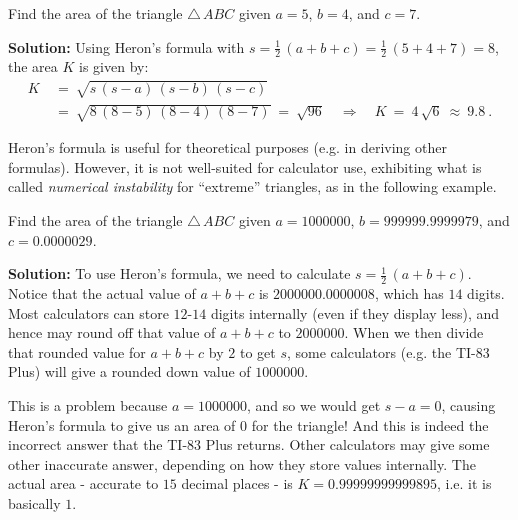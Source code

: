 \begin{exmp}\label{exmp:heron}
\noindent Find the area of the triangle $\triangle\,ABC$ given $a=5$, $b=4$, and $c = 7$.\vspace{1mm}
 \par\noindent\textbf{Solution:} Using Heron's formula with $s = \frac{1}{2}\,(a+b+c) =
 \frac{1}{2}\,(5+4+7) = 8$, the area $K$ is given by:
 \begin{align*}
  K ~&=~ \sqrt{s\,(s-a)\,(s-b)\,(s-c)}\\
   &=~ \sqrt{8\,(8-5)\,(8-4)\,(8-7)} ~=~ \sqrt{96} \quad\Rightarrow\quad \boxed{K ~=~ 4\,\sqrt{6}
   ~\approx~ 9.8} ~.
 \end{align*}
\end{exmp}\vspace{-3mm}
\divider
\vspace{1mm}

Heron's formula is useful for theoretical purposes (e.g. in deriving other formulas).
However, it is not well-suited for calculator use, exhibiting what is
called \emph{numerical instability} for ``extreme'' triangles, as in the following example.

\begin{exmp}\label{exmp:heronfail}
 Find the area of the triangle $\triangle\,ABC$ given $a=1000000$, $b=999999.9999979$, and
 $c = 0.0000029$.\vspace{1mm}
 \par\noindent\textbf{Solution:} To use Heron's formula, we need to calculate
 $s = \frac{1}{2}\,(a+b+c)$. Notice that the actual value of $a+b+c$ is $2000000.0000008$, which
 has $14$ digits. Most calculators can store $12$-$14$ digits internally (even if they display
 less), and hence may round off that value of $a+b+c$ to $2000000$. When we then divide that
 rounded value for $a+b+c$ by $2$ to get $s$, some calculators (e.g. the TI-83 Plus) will give a
 rounded down value of $1000000$.
 
 This is a problem because $a=1000000$, and so we would get $s-a=0$, causing Heron's formula to
 give us an area of $0$ for the triangle! And this is indeed the incorrect answer that the TI-83
 Plus returns. Other calculators may give some other inaccurate
 answer, depending on how they store values internally. The actual area - accurate to $15$
 decimal places - is $K = 0.99999999999895$, i.e. it is basically $1$.
\end{exmp}\vspace{-3mm}
\divider
\vspace{1mm}


